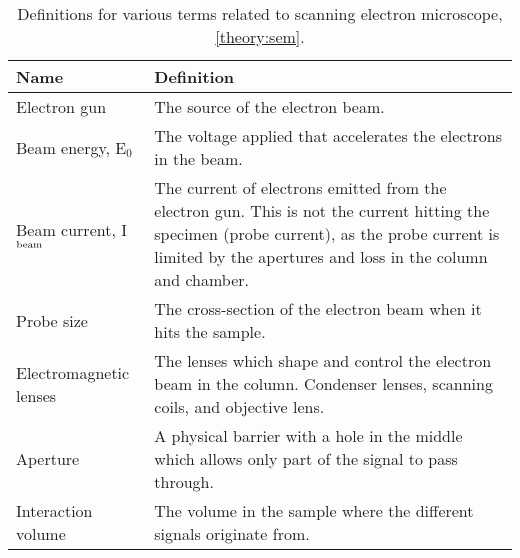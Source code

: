 \begin{table}[phb]
    \begin{center}
        \caption{
            Definitions for various terms related to scanning electron microscope, \cref{theory:sem}.
        }
        \renewcommand*{\arraystretch}{1.4}
        \label{tab:sem}
        \begin{tabular}{p{4cm}p{10.6cm}}
            \hline
            \textbf{Name}                       & \textbf{Definition}                                                                                                                                                                                        \\
            \hline
            Electron gun                        & The source of the electron beam.                                                                                                                                                                           \\
            Beam energy, E$_0$                  & The voltage applied that accelerates the electrons in the beam.                                                                                                                                            \\
            Beam current, I$_\textnormal{beam}$ & The current of electrons emitted from the electron gun. This is not the current hitting the specimen (probe current), as the probe current is limited by the apertures and loss in the column and chamber. \\
            Probe size                          & The cross-section of the electron beam when it hits the sample.                                                                                                                                            \\
            Electromagnetic lenses              & The lenses which shape and control the electron beam in the column. Condenser lenses, scanning coils, and objective lens.                                                                                  \\
            Aperture                            & A physical barrier with a hole in the middle which allows only part of the signal to pass through.                                                                                                         \\
            Interaction volume                  & The volume in the sample where the different signals originate from.                                                                                                                                       \\

\end{tabular}
\end{center}
\end{table}
